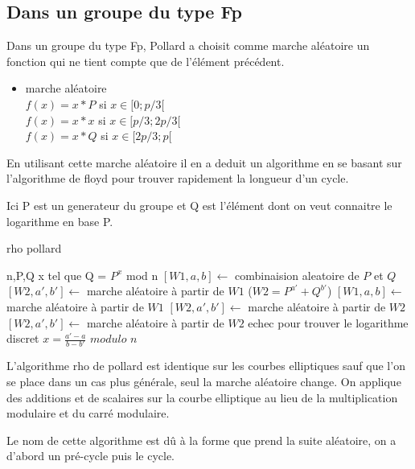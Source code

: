 \documentclass[a4paper,10pt]{report}
\begin{document}
\subsection{Dans un groupe du type Fp}

Dans un groupe du type Fp, Pollard a choisit comme marche aléatoire un fonction qui ne tient compte que de l'élément précédent.\\

\begin{itemize}
\item{marche aléatoire}\\
{
$ f(x) = x*P$ si $x \in [0;p/3[$\\
$ f(x) = x*x$ si $x \in [p/3;2p/3[$\\
$ f(x) = x*Q$ si $x \in [2p/3;p[$\\
}
\end{itemize}

En utilisant cette marche aléatoire il en a deduit un algorithme en se basant sur l'algorithme de floyd pour trouver rapidement la longueur d'un cycle.

Ici P est un generateur du groupe et Q est l'élément dont on veut connaitre le logarithme en base P.

{
 \begin{algorithm}
 \caption{rho pollard}
 \begin{algorithmic}
  \REQUIRE n,P,Q
  \ENSURE x tel que Q = $P^x$ mod n
    \STATE $[W1,a,b] \leftarrow$ combinaision aleatoire de $P$ et $Q$
    \STATE $[W2,a',b'] \leftarrow$  marche aléatoire à partir de $W1$
	\STATE ($W2 = P^{a'} + Q^{b'}$)
      \STATE $[W1,a,b] \leftarrow$ marche aléatoire à partir de $W1$
      \STATE $[W2,a',b'] \leftarrow$ marche aléatoire à partir de $W2$
      \STATE $[W2,a',b'] \leftarrow$ marche aléatoire à partir de $W2$
    \ENDWHILE
    \STATE echec pour trouver le logarithme discret
  \ELSE
    \STATE $ x = \frac{a'-a}{b-b'}$ $modulo$ $n$
  \ENDIF
 
 \end{algorithmic}
 \end{algorithm}
 }


L'algorithme rho de pollard est identique sur les courbes elliptiques sauf que l'on se place dans un cas plus générale,
seul la marche aléatoire change. On applique des additions et de scalaires sur la courbe elliptique au lieu de la multiplication modulaire et du carré modulaire.

Le nom de cette algorithme est dû à la forme que prend la suite aléatoire, on a d'abord un pré-cycle puis le cycle.
\end{document}
